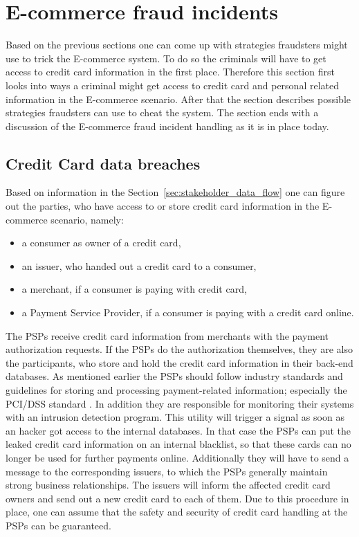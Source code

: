 
\section{\gls{E-commerce} fraud incidents}
\label{sec:scenario_fraud}

Based on the previous sections one can come up with strategies fraudsters might use to trick the \gls{E-commerce} system. To do so the criminals will have to get access to credit card information in the first place. Therefore this section first looks into ways a criminal might get access to credit card and personal related information in the \gls{E-commerce} scenario. After that the section describes possible strategies fraudsters can use to cheat the system. The section ends with a discussion of the \gls{E-commerce} fraud incident handling as it is in place today.

\subsection{Credit Card data breaches}
\label{subsec:leaking_credit_cards}

Based on information in the Section~\ref{sec:stakeholder_data_flow} one can figure out the parties, who have access to or store credit card information in the \gls{E-commerce} scenario, namely:\@

\begin{itemize}
  \item a consumer as owner of a credit card,
  \item an issuer, who handed out a credit card to a consumer,
  \item a merchant, if a consumer is paying with credit card,
  \item a Payment Service Provider, if a consumer is paying with a credit card online.
\end{itemize}

The \gls{PSP}s receive credit card information from merchants with the payment authorization requests. If the \gls{PSP}s do the authorization themselves, they are also the participants, who store and hold the credit card information in their back-end databases. As mentioned earlier the \gls{PSP}s should follow industry standards and guidelines for storing and processing payment-related information; especially the \gls{PCI/DSS} standard \citep{virtue2009payment}. In addition they are responsible for monitoring their systems with an intrusion detection program. This utility will trigger a signal as soon as an hacker got access to the internal databases. In that case the \gls{PSP}s can put the leaked credit card information on an internal blacklist, so that these cards can no longer be used for further payments online. Additionally they will have to send a message to the corresponding issuers, to which the \gls{PSP}s generally maintain strong business relationships. The issuers will inform the affected credit card owners and send out a new credit card to each of them. Due to this procedure in place, one can assume that the safety and security of credit card handling at the \gls{PSP}s can be guaranteed. \\

